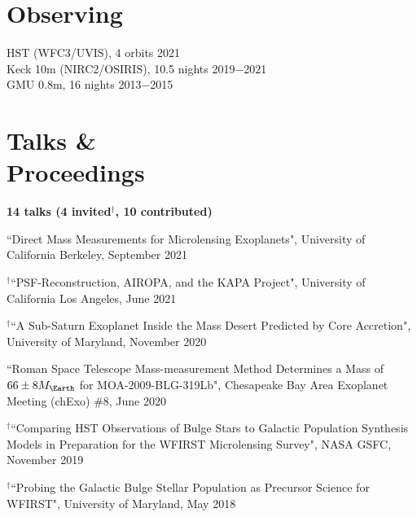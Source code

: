 \documentclass[margin,line]{cv}
\begin{document}
\begin{resume}
\section{\sc Observing}
HST (WFC3/UVIS), 4 orbits \hfill 2021\\
Keck 10m (NIRC2/OSIRIS), 10.5 nights \hfill 2019$-$2021\\
GMU 0.8m, 16 nights \hfill 2013$-$2015 \\

\section{\sc Talks \&\\ Proceedings}
\textbf{14 talks (4 invited$^{\dagger}$, 10 contributed)}\\
\begin{etaremune}

\item ``Direct Mass Measurements for Microlensing Exoplanets", University of California Berkeley, September 2021

\item $^{\dagger}$``PSF-Reconstruction, AIROPA, and the KAPA Project", University of California Los Angeles, June 2021

\item $^{\dagger}$``A Sub-Saturn Exoplanet Inside the Mass Desert Predicted by Core Accretion", University of Maryland, November 2020

\item ``Roman Space Telescope Mass-measurement Method Determines a Mass of $66 \pm 8M_{\Earth}$ for MOA-2009-BLG-319Lb", Chesapeake Bay Area Exoplanet Meeting (chExo) \#8, June 2020

\item $^{\dagger}$``Comparing HST Observations of Bulge Stars to Galactic Population Synthesis Models in Preparation for the WFIRST Microlensing Survey", NASA GSFC, November 2019 
\item $^{\dagger}$``Probing the Galactic Bulge Stellar Population as Precursor Science for WFIRST", University of Maryland, May 2018


\end{etaremune}
\end{resume}
\end{document}
